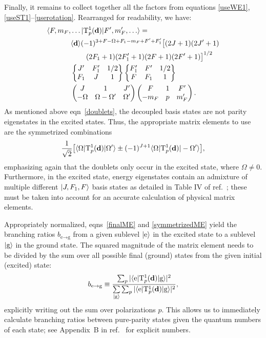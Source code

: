 Finally, it remains to collect together all the factors from equations
\ref{useWE1}, \ref{useST1}--\ref{userotation}. Rearranged for readability, we
have:
%
\begin{equation}
    \label{finalME}
\begin{aligned}
    \langle F,m_F,&\ldots|\mathrm{T}_p^1(\mathbf{d})|F',m_F',\ldots\rangle=
    \\&\langle \mathbf{d}\rangle
    (-1)^{3+F-\Omega+F_1-m_F+F'+F_1'}
    \big[{(2J+1)(2J'+1)}\\
    &\mbox{}\hspace{5ex}{(2F_1+1)(2F_1'+1)}{(2F+1)(2F'+1)}\big]^{1/2}\\
    &\begin{Bmatrix}J'&F_1'&1/2\\F_1&J&1\end{Bmatrix}
    \begin{Bmatrix}F_1'&F'&1/2\\F&F_1&1\end{Bmatrix}\\
    &\begin{pmatrix}J&1&J'\\-\Omega&\Omega-\Omega'&\Omega'\end{pmatrix}
    \begin{pmatrix}F&1&F'\\-m_F&p&m_F'\end{pmatrix}.
\end{aligned}
\end{equation}
%
As mentioned above eqn~\ref{doublets}, the decoupled basis states are not parity
eigenstates in the excited states. Thus, the appropriate matrix elements to use
are the symmetrized combinations
%
\begin{equation}
    \label{symmetrizedME}
    \frac{1}{\sqrt2}
    \big[
        \langle\Omega|\mathrm{T}_p^1(\mathbf{d})|\Omega'\rangle
        \pm(-1)^{J+1}
        \langle\Omega|\mathrm{T}_p^1(\mathbf{d})|-\Omega'\rangle
    \big],
\end{equation}
%
emphasizing again that the doublets only occur in the excited state, where
$\Omega\ne0$. Furthermore, in the excited state, energy eigenstates contain an
admixture of multiple different $|J,F_1,F\rangle$ basis states as detailed in
Table IV of ref.~\cite{norrgard2017hyperfine}; these must be taken into account
for an accurate calculation of physical matrix elements.

Appropriately normalized, eqns~\ref{finalME} and \ref{symmetrizedME} yield the
branching ratios $b_\text{e$\to$g}$ from a given sublevel $|\text{e}\rangle$ in
the excited state to a sublevel $|\text{g}\rangle$ in the ground state. The
squared magnitude of the matrix element needs to be divided by the sum over all
possible final (ground) states from the given initial (excited) state:
%
\begin{equation}
    \label{branchingratios}
    b_\text{e$\to$g}\equiv
    \frac{\sum_p|\langle\text{e}|\mathrm{T}_p^1(\mathbf{d})|\text{g}\rangle|^2}
         {\sum\limits_{|\text{g}\rangle}\sum_p|\langle\text{e}|\mathrm{T}_p^1(\mathbf{d})|\text{g}\rangle|^2},
\end{equation}
%
explicitly writing out the sum over polarizations $p$. This allows us to
immediately calculate branching ratios between pure-parity states given the
quantum numbers of each state; see Appendix~B in ref.~\cite{wenz2021thesis} for
explicit numbers.


